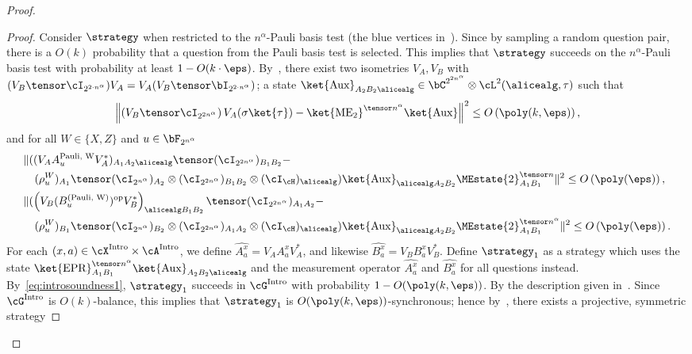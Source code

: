 \begin{proof}
	\begin{proof}
		Consider $\strategy$ when restricted to the $n^{\alpha}$-Pauli basis test (the blue vertices in~). Since by sampling a random question pair, there is a $O(k)$ probability that a question from the Pauli basis test is selected. This implies that $\strategy$ succeeds on the $n^{\alpha}$-Pauli basis test with probability at least $1 - O(k \cdot\eps)$. By~, there exist two isometries $V_{A}, V_{B}$ with $(V_B \tensor \cI_{2^{2 \cdot n^{\alpha}}}) V_{A} =  V_{A} (V_B \tensor \bI_{2^{2 \cdot n^{\alpha}}})$; a state $\ket{\text{Aux}}_{A_2 B_2 \alicealg}  \in \bC^{2^{2n^\alpha}} \otimes \cL^2(\alicealg, \tau)$ such that	\begin{equation} \label{eq:introsoundness1}
			\left\| \left(  V_B \tensor \cI_{2^{2n^{\alpha}}}  \right) V_{A} (\sigma \ket{\tau})  -\ket{\text{ME}_2}^{\tensor n^{\alpha}} \ket{\text{Aux}}   \right\|^2 \leq O\left(\poly(k, \eps)\right),
		\end{equation}
		and for all $W \in \{X, Z\}$ and $u \in \bF_{2^{n^\alpha}}$
		\begin{align} 
			\nonumber &\|  ((V_{A} A^{\text{Pauli, W}}_u  V_{A}^*)_{ A_1 A_2 \alicealg} \tensor (\cI_{2^{2n^{\alpha}}} )_{B_1 B_2} - \\
			\label{eq:introsoundnessrig1} &\quad  (\rho^{W}_u)_{A_1} \tensor (\cI_{2^{n^{\alpha}}})_{A_2} \otimes  (\cI_{2^{2n^{\alpha}}} )_{B_1 B_2}  \otimes (\cI_{\cH})_{\alicealg})  \ket{\text{Aux}}_{\alicealg A_2 B_2}  \MEstate{2}^{\tensor n}_{A_1 B_1}  \|^2 \leq O\left(\poly(\eps )\right), \\
			\nonumber &\|  ( \left(V_{B} ( B^{(\text{Pauli, W})}_u)^{\text{op}}  V_{B}^*\right)_{\alicealg B_1 B_2} \tensor (\cI_{2^{2n^{\alpha}}} )_{A_1 A_2} - \\
			\label{eq:introsoundnessrig2} &\quad  (\rho^{W}_u)_{B_1} \tensor (\cI_{2^{n^\alpha}})_{B_2} \otimes  (\cI_{2^{2n^\alpha}} )_{A_1 A_2} \otimes (\cI_{\cH})_{\alicealg} ) \ket{\text{Aux}}_{\alicealg A_2 B_2}  \MEstate{2}^{\tensor n^\alpha}_{A_1 B_1}  \|^2 \leq O\left(\poly(\eps )\right).
		\end{align}
		For each $(x, a) \in \cX^{\text{Intro}} \times \cA^{\text{Intro}}$, we define $\hat{A_a^x} = V_{A} A^{x}_a V_{A}^*$, and likewise $\hat{B_a^x} = V_B B^{x}_a V_B^*$. Define $\strategy_1$ as a strategy which uses the state $\ket{\text{EPR}}^{\tensor n^{\alpha}}_{A_1 B_1} \ket{\text{Aux}}_{A_2 B_2 \alicealg}$ and the measurement operator $\hat{A_a^x}$ and $\hat{B_a^x}$ for all questions instead. By~\eqref{eq:introsoundness1}, $\strategy_1$ succeeds in $\cG^{\text{Intro}}$ with probability $1 - O(\poly(k, \eps))$. By the description given in~.  Since $\cG^{\text{Intro}}$ is $O(k)$-balance, this implies that $\strategy_1$ is $O(\poly(k,\eps))$-synchronous; hence by~, there exists a projective, symmetric strategy

\end{proof}
\end{proof}
